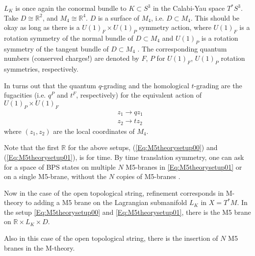 \documentclass[a4paper,titlepage,twoside]{book}
\begin{document}
$L_K$ is once again the conormal bundle to $K \subset S^3$ in the Calabi-Yau space $T^*S^3$.  Take $D\cong \mathbb{R}^2$, and $M_4 \cong \mathbb{R}^4$.  $D$ is a surface of $M_4$, i.e. $D\subset M_4$.  This should be okay as long as there is a $U(1)_F \times U(1)_P$ symmetry action, where $U(1)_F$ is a rotation symmetry of the normal bundle of $D\subset M_4$ and $U(1)_P$ is a rotation symmetry of the tangent bundle of $D\subset M_4$ \cite{FujiGukovSulkowski2012}.  The corresponding quantum numbers (conserved charges!) are denoted by $F$, $P$ for $U(1)_F$, $U(1)_P$ rotation symmetries, respectively.  

In turns out that the quantum $q$-grading and the homological $t$-grading are the fugacities (i.e. $q^P$ and $t^F$, respectively) for the equivalent action of $U(1)_P \times U(1)_F$
\begin{equation}
\begin{aligned}
  & z_1 \to qz_1 \\
  & z_2 \to tz_2
\end{aligned}
\end{equation}
where $(z_1, z_2)$ are the local coordinates of $M_4$.  

Note that the first $\mathbb{R}$ for the above setups, (\ref{Eq:M5theorysetup00}) and (\ref{Eq:M5theorysetup01}), is for time.  By time translation symmetry, one can ask for a space of BPS states on multiple $N$ M5-branes in \eqref{Eq:M5theorysetup01} or on a single M5-brane, without the $N$ copies of M5-branes \cite{GukovStosic2012}.  







Now in the case of the open topological string, refinement corresponds in M-theory to adding a M5 brane on the Lagrangian submanifold $L_K$ in $X=T^*M$.  In the setup \eqref{Eq:M5theorysetup00} and \eqref{Eq:M5theorysetup01}, there is the M5 brane on $\mathbb{R} \times L_K \times D$.  

Also in this case of the open topological string, there is the insertion of $N$ M5 branes in the M-theory.  
\end{document}
